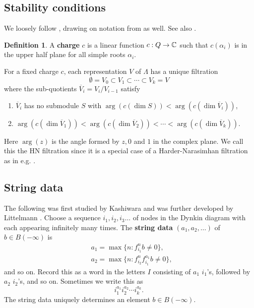 \documentclass{amsart}
\numberwithin{equation}{section}
\numberwithin{figure}{section}
\numberwithin{table}{section}
\theoremstyle{definition}
\newtheorem{Definition}[equation]{Definition}
\begin{document}
 

\subsection{Stability conditions}
We loosely follow \cite{BKT:2014}, drawing on notation from \cite{TW} as well. See also \cite{T21}.

\begin{Definition}
A {\bf charge} $c$ is a linear function $c: Q \rightarrow {\Bbb C}$ such that $c(\alpha_i)$ is in the upper half plane for all simple roots $\alpha_i$. 
\end{Definition}
For a fixed charge $c$, each representation $V$ of $\Lambda$ has a unique filtration 
$$\emptyset = V_0 \subset V_1 \subset \cdots \subset V_k= V$$
where the sub-quotients $\overline V_i=V_i/V_{i-1}$ satisfy
\begin{enumerate}
\item[(HN1)] $ \overline V_i$ has no submodule $S$ with $\arg(c(\dim S))< \arg(c( \dim  \overline V_i))$,

\item [(HN2)] $\arg(c (\dim  \overline V_1)) < \arg(c (\dim  \overline V_2)) < \cdots < \arg(c (\dim  \overline V_k))$.

\end{enumerate}
Here $\arg(z)$ is the angle formed by $z,0$ and $1$ in the complex plane. We call this the HN filtration since it is a special case of a Harder-Narasimhan filtration as in e.g. \cite{Rudakov97}. 



\subsection{String data} \label{ss:stringdata}
The following was first studied by Kashiwara 
\cite[\S 8.2]{Kashiwara:1995} and  
was further developed by Littelmann \cite{Littelmann:1998}. 
Choose a sequence 
$i_1, i_2, i_3 \ldots$
of nodes in the Dynkin diagram with each appearing infinitely many times. 
The {\bf string data} $(a_1,a_2, \ldots)$ of $b \in B(-\infty)$ is 
\[
\begin{aligned}
& a_1= \max \{ n : f_{i_1}^n b \neq 0 \}, \\
&  a_2= \max \{ n : f_{i_2}^n f_{i_1}^{a_1} b \neq 0\},
\end{aligned}
\]
and so on. 
Record this as a word in the letters $I$ consisting of $a_1$ $i_1$'s, followed by $a_2$ $i_2$'s, and so on.  Sometimes we write this as
$$i_1^{a_1} i_2 ^{a_2} \cdots i_k ^{a_k}.$$
The string data uniquely determines an element $b \in B(-\infty)$. 
\end{document}
